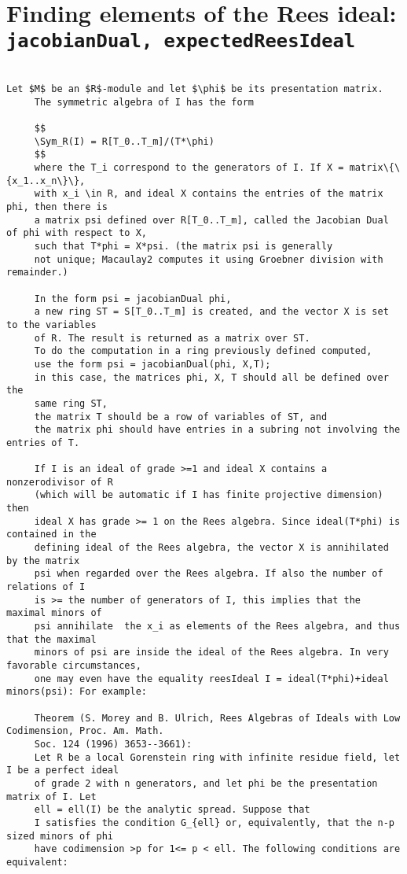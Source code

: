 \documentclass[twoside,12pt, leqno]{amsart}
\begin{document}
\section{Finding elements of the Rees ideal: {\tt jacobianDual, expectedReesIdeal}}
\begin{verbatim}
 
Let $M$ be an $R$-module and let $\phi$ be its presentation matrix.
     The symmetric algebra of I has the form 
     
     $$
     \Sym_R(I) = R[T_0..T_m]/(T*\phi)
     $$
     where the T_i correspond to the generators of I. If X = matrix\{\{x_1..x_n\}\},
     with x_i \in R, and ideal X contains the entries of the matrix phi, then there is 
     a matrix psi defined over R[T_0..T_m], called the Jacobian Dual of phi with respect to X,
     such that T*phi = X*psi. (the matrix psi is generally
     not unique; Macaulay2 computes it using Groebner division with remainder.)
     
     In the form psi = jacobianDual phi,
     a new ring ST = S[T_0..T_m] is created, and the vector X is set to the variables
     of R. The result is returned as a matrix over ST. 
     To do the computation in a ring previously defined computed, 
     use the form psi = jacobianDual(phi, X,T);
     in this case, the matrices phi, X, T should all be defined over the
     same ring ST, 
     the matrix T should be a row of variables of ST, and
     the matrix phi should have entries in a subring not involving the entries of T.
      
     If I is an ideal of grade >=1 and ideal X contains a nonzerodivisor of R
     (which will be automatic if I has finite projective dimension) then
     ideal X has grade >= 1 on the Rees algebra. Since ideal(T*phi) is contained in the
     defining ideal of the Rees algebra, the vector X is annihilated by the matrix
     psi when regarded over the Rees algebra. If also the number of relations of I
     is >= the number of generators of I, this implies that the maximal minors of
     psi annihilate  the x_i as elements of the Rees algebra, and thus that the maximal
     minors of psi are inside the ideal of the Rees algebra. In very favorable circumstances,
     one may even have the equality reesIdeal I = ideal(T*phi)+ideal minors(psi): For example:
     
     Theorem (S. Morey and B. Ulrich, Rees Algebras of Ideals with Low Codimension, Proc. Am. Math.
     Soc. 124 (1996) 3653--3661):
     Let R be a local Gorenstein ring with infinite residue field, let I be a perfect ideal
     of grade 2 with n generators, and let phi be the presentation matrix of I. Let
     ell = ell(I) be the analytic spread. Suppose that
     I satisfies the condition G_{ell} or, equivalently, that the n-p sized minors of phi 
     have codimension >p for 1<= p < ell. The following conditions are equivalent:
     

\end{verbatim}
\end{document}
